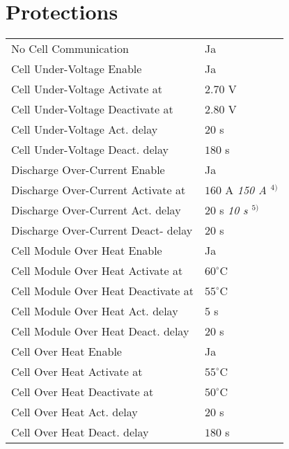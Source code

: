 \section*{Protections}
\begin{tabular}{p{11cm}p{3cm}}
	No Cell Communication & Ja \\
	Cell Under-Voltage Enable & Ja \\
	Cell Under-Voltage Activate at & $2.70$ V \\
	Cell Under-Voltage Deactivate at & $2.80$ V \\
	Cell Under-Voltage Act. delay & $20$ s \\
	Cell Under-Voltage Deact. delay & $180$ s \\
	Discharge Over-Current Enable & Ja \\
	Discharge Over-Current Activate at & $160$ A \textit{150 A $^{4)}$} \\
	Discharge Over-Current Act. delay & $20$ s \textit{10 s $^{5)}$}\\
	Discharge Over-Current Deact- delay & $20$ s \\
	Cell Module Over Heat Enable & Ja \\
	Cell Module Over Heat Activate at & $60^\circ$C \\
	Cell Module Over Heat Deactivate at & $55^\circ$C \\
	Cell Module Over Heat Act. delay & $5$ s \\
	Cell Module Over Heat Deact. delay & $20$ s \\
	Cell Over Heat Enable & Ja \\
	Cell Over Heat Activate at & $55^\circ$C \\
	Cell Over Heat Deactivate at & $50^\circ$C \\
	Cell Over Heat Act. delay & $20$ s \\
	Cell Over Heat Deact. delay & $180$ s
\end{tabular}


